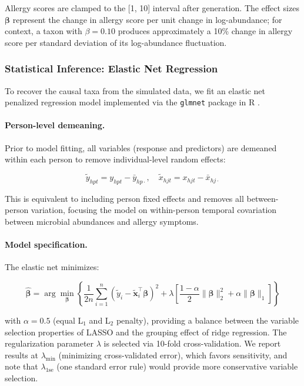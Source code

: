 \documentclass[11pt,letterpaper]{article}
\begin{document}
Allergy scores are clamped to the [1, 10] interval after generation. The effect sizes $\boldsymbol{\beta}$ represent the change in allergy score per unit change in log-abundance; for context, a taxon with $\beta = 0.10$ produces approximately a 10\% change in allergy score per standard deviation of its log-abundance fluctuation.

\subsubsection{Statistical Inference: Elastic Net Regression}

To recover the causal taxa from the simulated data, we fit an elastic net penalized regression model \citep{zou2005regularization} implemented via the \texttt{glmnet} package in R \citep{friedman2010regularization}.

\paragraph{Person-level demeaning.} Prior to model fitting, all variables (response and predictors) are demeaned within each person to remove individual-level random effects:

\begin{equation}
    \tilde{y}_{hpt} = y_{hpt} - \bar{y}_{hp\cdot}, \quad \tilde{x}_{hjt} = x_{hjt} - \bar{x}_{hj\cdot}
\end{equation}

This is equivalent to including person fixed effects and removes all between-person variation, focusing the model on within-person temporal covariation between microbial abundances and allergy symptoms.

\paragraph{Model specification.} The elastic net minimizes:

\begin{equation}
    \hat{\boldsymbol{\beta}} = \arg\min_{\boldsymbol{\beta}} \left\{ \frac{1}{2n} \sum_{i=1}^n \left( \tilde{y}_i - \tilde{\mathbf{x}}_i^\top \boldsymbol{\beta} \right)^2 + \lambda \left[ \frac{1-\alpha}{2} \|\boldsymbol{\beta}\|_2^2 + \alpha \|\boldsymbol{\beta}\|_1 \right] \right\}
\end{equation}

\noindent with $\alpha = 0.5$ (equal L$_1$ and L$_2$ penalty), providing a balance between the variable selection properties of LASSO and the grouping effect of ridge regression. The regularization parameter $\lambda$ is selected via 10-fold cross-validation. We report results at $\lambda_{\min}$ (minimizing cross-validated error), which favors sensitivity, and note that $\lambda_{1\text{se}}$ (one standard error rule) would provide more conservative variable selection.
\end{document}
